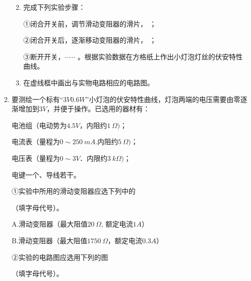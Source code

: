 \begin{enumerate}[leftmargin=0em]
\begin{enumerate}
\renewcommand{\labelenumi}{\arabic{enumi}.}
\item
完成下列实验步骤：

①闭合开关前，调节滑动变阻器的滑片，  
； 

②闭合开关后，逐渐移动变阻器的滑片，  
；

③断开开关，$ \cdots \cdots $ 。根据实验数据在方格纸上作出小灯泡灯丝的伏安特性曲线。
\item 
在虚线框中画出与实物电路相应的电路图。
\begin{figure}[h!]
\centering

\end{figure}



\end{enumerate}





\newpage
\item
{}
要测绘一个标有“$ 3V 0.6W $”小灯泡的伏安特性曲线，灯泡两端的电压需要由零逐渐增加到$ 3V $，并便于操作。已选用的器材有：

电池组（电动势为$ 4.5V $，内阻约$ 1 \ \Omega ) $；

电流表（量程为$ 0 \sim 250 \ mA $.内阻约$ 5 \ \Omega ) $；

电压表（量程为$ 0 \sim 3V $．内限约$ 3 \ k\Omega ) $；

电键一个、导线若干。

①实验中所用的滑动变阻器应选下列中的  

（填字母代号）。

A.滑动变阻器（最大阻值$ 20 \ \Omega $, 额定电流$ 1A $）

B.滑动变阻器（最大阻值$ 1750 \ \Omega $，额定电流$ 0.3A $）

②实验的电路图应选用下列的图  

（填字母代号）。
\begin{figure}[h!]
\centering

\end{figure}


\end{enumerate}
